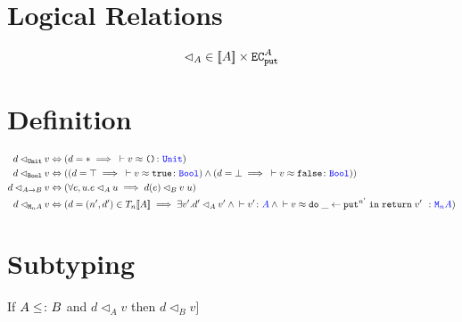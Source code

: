 \documentclass{Report}
\newcommand{\relates}[0]{\lhd}
\newcommand{\logRel}[3]{#1 \relates_{#2} #3}
\newcommand{\zberelation}[3]{\berelation{}{#1}{#2}{#3}}
\newcommand\ztyperelation[2]{\typerelation{}{#1}{#2}}
\renewcommand\put[0]{\texttt{put}}
\newcommand\ecputA[0]{\texttt{EC}_\put^A}
\newcommand\mna[0]{\M{n}{A}}
\begin{document}
\section{Logical Relations}

\begin{equation}
    \label{LogicalRelationType}
    \relates_A \in \deno{A} \times \ecputA    
\end{equation}

\section{Definition}
\begin{definition}

    \begin{align}
        \label{LogicalRelationDefinition}
        \logRel{d}{\U}{v} & \Leftrightarrow (d=\singleton \implies \zberelation{v}{\u}{\U})\\
        \logRel{d}{\B}{v} & \Leftrightarrow ((d=\top \implies \zberelation{v}{\t}{\B}) \wedge (d=\bot \implies \zberelation{v}{\f}{\B}))\\
        \logRel{d}{\ab}{v} & \Leftrightarrow (\forall e, u. \logRel{e}{A}{u}\implies \logRel{d(e)}{B}{\apply{v}{u}})\\
        \logRel{d}{\mna}{v}&\Leftrightarrow  (d= (n', d')\in \T{n}{\deno{A}} \implies \exists v'. \logRel{d'}{A}{v'} \wedge \ztyperelation{v'}{A}\wedge \zberelation{v}{\doin{\_}{\put^{n'}}{\return{v'}}}{\mna})
    \end{align}
\end{definition}
\section{Subtyping}

\begin{theorem}
    If $A\leq\colon B$ and $\logRel{d}{A}{v}$ then $\logRel{d}{B}{v]}$
\end{theorem}
\end{document}
